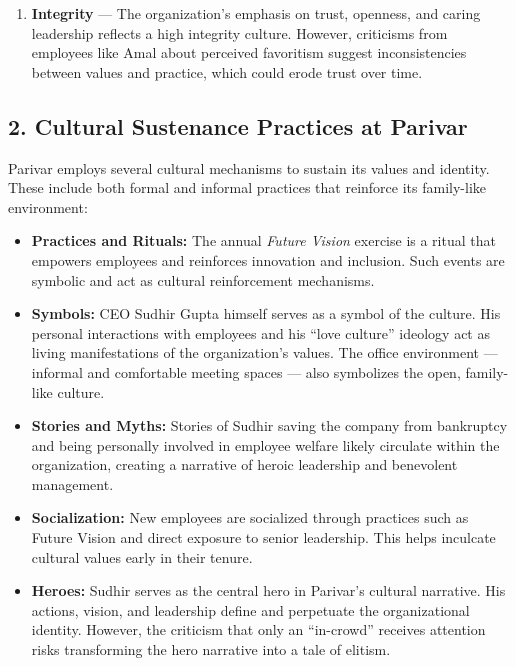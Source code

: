 \documentclass[10pt,a4paper]{book}
\begin{document}
\begin{multicols}{2}
\begin{enumerate}
    \item \textbf{Integrity} --- The organization's emphasis on trust, openness, and caring leadership reflects a high integrity culture. However, criticisms from employees like Amal about perceived favoritism suggest inconsistencies between values and practice, which could erode trust over time.
\end{enumerate}

\subsection*{2. Cultural Sustenance Practices at Parivar}

Parivar employs several cultural mechanisms to sustain its values and identity. These include both formal and informal practices that reinforce its family-like environment:

\begin{itemize}
    \item \textbf{Practices and Rituals:} The annual \textit{Future Vision} exercise is a ritual that empowers employees and reinforces innovation and inclusion. Such events are symbolic and act as cultural reinforcement mechanisms.

    \item \textbf{Symbols:} CEO Sudhir Gupta himself serves as a symbol of the culture. His personal interactions with employees and his “love culture” ideology act as living manifestations of the organization’s values. The office environment — informal and comfortable meeting spaces — also symbolizes the open, family-like culture.

    \item \textbf{Stories and Myths:} Stories of Sudhir saving the company from bankruptcy and being personally involved in employee welfare likely circulate within the organization, creating a narrative of heroic leadership and benevolent management.

    \item \textbf{Socialization:} New employees are socialized through practices such as Future Vision and direct exposure to senior leadership. This helps inculcate cultural values early in their tenure.

    \item \textbf{Heroes:} Sudhir serves as the central hero in Parivar’s cultural narrative. His actions, vision, and leadership define and perpetuate the organizational identity. However, the criticism that only an “in-crowd” receives attention risks transforming the hero narrative into a tale of elitism.


\end{itemize}
\end{multicols}
\end{document}
